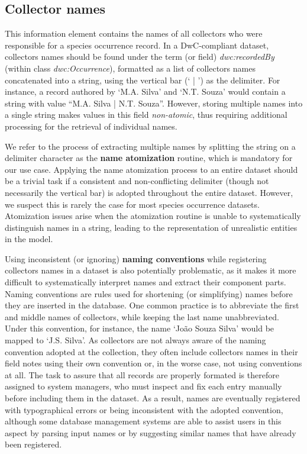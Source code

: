 \subsection{Collector names}\label{section:data_req_collector}
This information element contains the names of all collectors who were responsible for a species occurrence record.
In a DwC-compliant dataset, collectors names should be found under the term (or field) \textit{dwc:recordedBy} (within class \textit{dwc:Occurrence}), formatted as a list of collectors names concatenated into a string, using the vertical bar (` | ') as the delimiter.
For instance, a record authored by `M.A. Silva' and `N.T. Souza' would contain a string with value ``M.A. Silva | N.T. Souza''.
However, storing multiple names into a single string makes values in this field \textit{non-atomic}, thus requiring additional processing for the retrieval of individual names.

We refer to the process of extracting multiple names by splitting the string on a delimiter character as the \textbf{name atomization} routine, which is mandatory for our use case.
Applying the name atomization process to an entire dataset should be a trivial task if a consistent and non-conflicting delimiter (though not necessarily the vertical bar) is adopted throughout the entire dataset.
However, we suspect this is rarely the case for most species occurrence datasets.
Atomization issues arise when the atomization routine is unable to systematically distinguish names in a string, leading to the representation of unrealistic entities in the model.

Using inconsistent (or ignoring) \textbf{naming conventions} while registering collectors names in a dataset is also potentially problematic, as it makes it more difficult to systematically interpret names and extract their component parts.
Naming conventions are rules used for shortening (or simplifying) names before they are inserted in the database.
One common practice is to abbreviate the first and middle names of collectors, while keeping the last name unabbreviated.
Under this convention, for instance, the name `João Souza Silva' would be mapped to `J.S. Silva'.
As collectors are not always aware of the naming convention adopted at the collection, they often include collectors names in their field notes using their own convention or, in the worse case, not using conventions at all.
The task to assure that all records are properly formated is therefore assigned to system managers, who must inspect and fix each entry manually before including them in the dataset.
As a result, names are eventually registered with typographical errors or being inconsistent with the adopted convention, although some database management systems are able to assist users in this aspect by parsing input names or by suggesting similar names that have already been registered.

